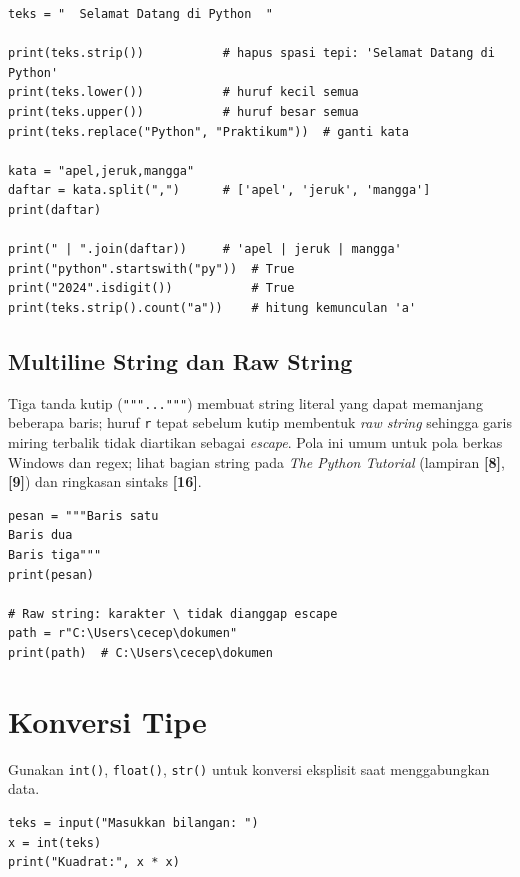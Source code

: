 \documentclass[../main.tex]{subfiles}
\begin{document}
\begin{lstlisting}[caption=Metode string bawaan]
teks = "  Selamat Datang di Python  "

print(teks.strip())           # hapus spasi tepi: 'Selamat Datang di Python'
print(teks.lower())           # huruf kecil semua
print(teks.upper())           # huruf besar semua
print(teks.replace("Python", "Praktikum"))  # ganti kata

kata = "apel,jeruk,mangga"
daftar = kata.split(",")      # ['apel', 'jeruk', 'mangga']
print(daftar)

print(" | ".join(daftar))     # 'apel | jeruk | mangga'
print("python".startswith("py"))  # True
print("2024".isdigit())           # True
print(teks.strip().count("a"))    # hitung kemunculan 'a'
\end{lstlisting}

\subsection{Multiline String dan Raw String}

\noindent Tiga tanda kutip (\texttt{"""..."""}) membuat string literal yang dapat memanjang beberapa baris; huruf \texttt{r} tepat sebelum kutip membentuk \textit{raw string} sehingga garis miring terbalik tidak diartikan sebagai \textit{escape}. Pola ini umum untuk pola berkas Windows dan regex; lihat bagian string pada \textit{The Python Tutorial} (lampiran \textbf{[8]}, \textbf{[9]}) dan ringkasan sintaks \textbf{[16]}.

\begin{lstlisting}[caption=String multiline dan raw]
pesan = """Baris satu
Baris dua
Baris tiga"""
print(pesan)

# Raw string: karakter \ tidak dianggap escape
path = r"C:\Users\cecep\dokumen"
print(path)  # C:\Users\cecep\dokumen
\end{lstlisting}

\section{Konversi Tipe}

Gunakan \texttt{int()}, \texttt{float()}, \texttt{str()} untuk konversi eksplisit saat menggabungkan data.

\begin{lstlisting}[caption=Konversi masukan pengguna]
teks = input("Masukkan bilangan: ")
x = int(teks)
print("Kuadrat:", x * x)
\end{lstlisting}
\end{document}
